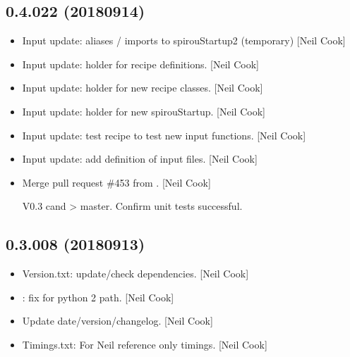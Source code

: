 \documentclass[a4paper,10pt,english]{report}
\begin{document}
\subsection{0.4.022 (2018\sphinxhyphen{}09\sphinxhyphen{}14)}
\label{\detokenize{misc/changelog:id344}}\begin{itemize}
\item {} 
Input update:  aliases / imports to
spirouStartup2 (temporary) {[}Neil Cook{]}

\item {} 
Input update:  \sphinxhyphen{} holder for recipe definitions. {[}Neil Cook{]}

\item {} 
Input update:  \sphinxhyphen{} holder for new recipe classes. {[}Neil
Cook{]}

\item {} 
Input update:  \sphinxhyphen{} holder for new spirouStartup. {[}Neil
Cook{]}

\item {} 
Input update:  \sphinxhyphen{} test recipe to test new input
functions. {[}Neil Cook{]}

\item {} 
Input update: add  \sphinxhyphen{} definition of input files. {[}Neil
Cook{]}

\item {} 
Merge pull request \#453 from . {[}Neil Cook{]}

V0.3 cand \textendash{}\textgreater{} master. Confirm unit tests successful.

\end{itemize}


\subsection{0.3.008 (2018\sphinxhyphen{}09\sphinxhyphen{}13)}
\label{\detokenize{misc/changelog:id345}}\begin{itemize}
\item {} 
Version.txt: update/check dependencies. {[}Neil Cook{]}

\item {} 
: fix for python 2 path. {[}Neil Cook{]}

\item {} 
Update date/version/changelog. {[}Neil Cook{]}

\item {} 
Timings.txt: For Neil reference only  timings. {[}Neil Cook{]}

\end{itemize}
\end{document}
